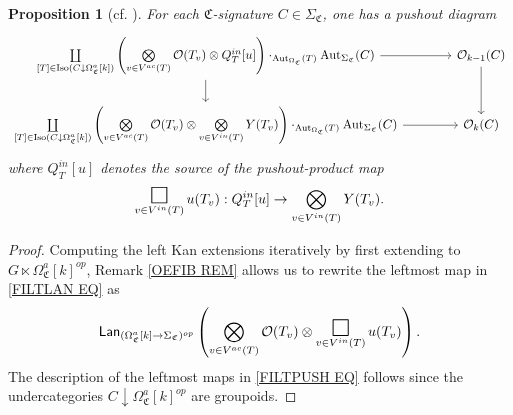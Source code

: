 \documentclass[a4paper,10pt
,draft
]{article}%
\numberwithin{equation}{section}
\numberwithin{figure}{section}
\newtheorem{proposition}[equation]{Proposition}%
\theoremstyle{definition} %
\newcommand{\Sym}{\ensuremath{\mathsf{Sym}}}%
\DeclareMathOperator{\Aut}{Aut}%
\DeclareMathOperator{\Iso}{Iso}
\newcommand{\V}{\ensuremath{\mathcal V}}
\renewcommand{\O}{\ensuremath{\mathcal O}}
\newcommand{\1}{\ensuremath{\mathbbm 1}}%
\newcommand{\SC}{\Sigma_{\mathfrak C}}
\newcommand{\OC}{\Omega_{\mathfrak C}}
\begin{document}
\begin{proposition}[{cf. \cite[Prop. 5.66]{BP_geo}}]
      \label{FILTPUSH PROP}
For each $\mathfrak C$-signature $C \in \Sigma_{\mathfrak C}$, one has a pushout diagram
      \vspace{-10pt}
\begin{align}\label{FILTPUSH EQ}
\begin{tikzcd}[ampersand replacement=\&]
	\mathop{\coprod}\limits_{[T] \in \Iso(C \downarrow \Omega_{\mathfrak C}^a[k])}
	\left(
		\mathop{\bigotimes}\limits_{v \in V^{ac}(T)} \O(T_v) \otimes
		Q^{in}_T[u]
	\right) \cdot_{\Aut_{\OC} (T)} \Aut_{\SC}(C)
		\arrow[r] \arrow[d]
\&[15pt]
	\O_{k-1}(C) \arrow[d]
\\                  
	\mathop{\coprod}\limits_{[T] \in \Iso(C \downarrow \Omega_{\mathfrak C}^a[k])}
	\left(
		\mathop{\bigotimes}\limits_{v \in V^{ac}(T)} \O(T_v) \otimes
		\mathop{\bigotimes}\limits_{v \in V^{in}(T)} Y(T_v)
	\right) \cdot_{\Aut_{\OC}(T)} \Aut_{\SC}(C)
		\arrow[r]
\&
\O_k(C)
\end{tikzcd}
\end{align}
      where $Q^{in}_T[u]$ denotes the source of the pushout-product map
      \begin{equation}
            \mathop{\mathlarger{\mathlarger{\mathlarger{\square}}}}_{v \in V^{in}(T)} u(T_v): Q^{in}_T[u] \to \bigotimes_{v \in V^{in}(T)} Y(T_v).
      \end{equation}
\end{proposition}

\begin{proof}
Computing the left Kan extensions iteratively by first extending to
$G \ltimes \OC^a[k]^{op}$, 
Remark \ref{OEFIB REM} allows us to rewrite 
the leftmost map in \eqref{FILTLAN EQ} as
\begin{equation}\label{FILTLANFIN EQ}
	\mathsf{Lan}_{(\OC^a[k] \to \SC)^{op}}\left(
		\bigotimes_{v \in V^{ac}(T)}\O(T_v) \otimes
		\mathop{\mathlarger{\mathlarger{\mathlarger{\square}}}}\limits_{v \in V^{in}(T)} u(T_v)
		\right).
\end{equation}
	The description of the leftmost maps in \eqref{FILTPUSH EQ} follows since the undercategories
	$C \downarrow \OC^a[k]^{op}$ are groupoids.
\end{proof}
\end{document}
